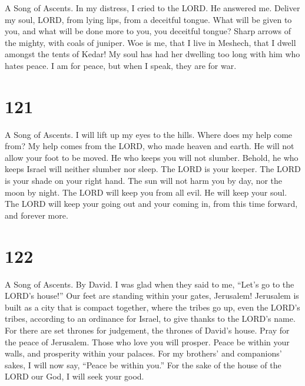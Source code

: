 A Song of Ascents.  In my distress, I cried to the LORD. He
answered me.  Deliver my soul, LORD, from lying lips, from a
deceitful tongue.  What will be given to you, and what will
be done more to you, you deceitful tongue?  Sharp arrows of
the mighty, with coals of juniper.  Woe is me, that I live
in Meshech, that I dwell amongst the tents of Kedar!  My
soul has had her dwelling too long with him who hates peace.
 I am for peace, but when I speak, they are for war.

\hypertarget{section-113}{%
\section{121}\label{section-113}}

A Song of Ascents.  I will lift up my eyes to the hills.
Where does my help come from?  My help comes from the LORD,
who made heaven and earth.  He will not allow your foot to
be moved. He who keeps you will not slumber.  Behold, he who
keeps Israel will neither slumber nor sleep.  The LORD is
your keeper. The LORD is your shade on your right hand.  The
sun will not harm you by day, nor the moon by night.  The
LORD will keep you from all evil. He will keep your soul. 
The LORD will keep your going out and your coming in, from this time
forward, and forever more.

\hypertarget{section-114}{%
\section{122}\label{section-114}}

A Song of Ascents. By David.  I was glad when they said to
me, ``Let's go to the LORD's house!''  Our feet are standing
within your gates, Jerusalem!  Jerusalem is built as a city
that is compact together,  where the tribes go up, even the
LORD's tribes, according to an ordinance for Israel, to give thanks to
the LORD's name.  For there are set thrones for judgement,
the thrones of David's house.  Pray for the peace of
Jerusalem. Those who love you will prosper.  Peace be within
your walls, and prosperity within your palaces.  For my
brothers' and companions' sakes, I will now say, ``Peace be within
you.''  For the sake of the house of the LORD our God, I
will seek your good.

